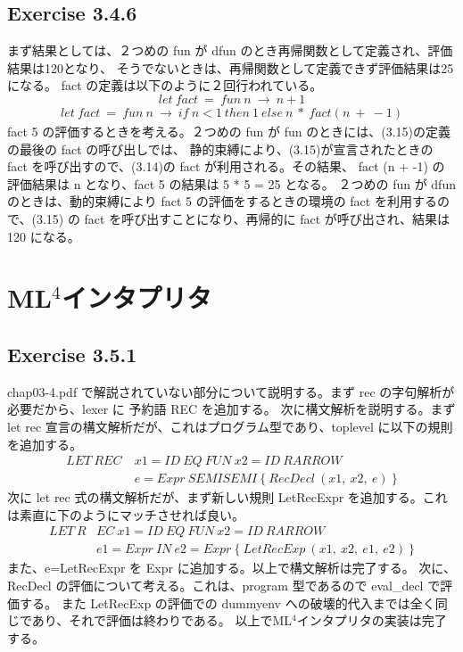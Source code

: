 \documentclass{jreport}
\begin{document}
		\section{Exercise 3.4.6}
			まず結果としては、２つめの fun が dfun のとき再帰関数として定義され、評価結果は120となり、
			そうでないときは、再帰関数として定義できず評価結果は25になる。
			fact の定義は以下のように２回行われている。
\begin{equation}let \ fact \ = \ fun \ n \ \rightarrow \ n+1\end{equation}
\begin{equation}
	\begin{split}
		let \ fact \ = \ fun \ n \ \rightarrow \ if \ n < 1 \ then \ 1 \ else \ n \ * \ fact(n \ + \ -1)
	\end{split}
\end{equation}
			fact 5 の評価するときを考える。２つめの fun が fun のときには、(3.15)の定義の最後の fact の呼び出しでは、
			静的束縛により、(3.15)が宣言されたときの fact を呼び出すので、(3.14)の fact が利用される。その結果、
			fact (n + -1) の評価結果は n となり、fact 5 の結果は 5 * 5 = 25 となる。
			２つめの fun が dfun のときは、動的束縛により fact 5 の評価をするときの環境の fact を利用するので、(3.15)
			の fact を呼び出すことになり、再帰的に fact が呼び出され、結果は 120 になる。
	\chapter{ML$^4$インタプリタ}
		\section{Exercise 3.5.1}
			chap03-4.pdf で解説されていない部分について説明する。まず rec の字句解析が必要だから、lexer に 予約語 REC を追加する。
			次に構文解析を説明する。まず let rec 宣言の構文解析だが、これはプログラム型であり、toplevel に以下の規則を追加する。
\begin{equation}
	\begin{split}
		LET \ REC \ &x1=ID \ EQ \ FUN \ x2=ID \ RARROW \ \\ &e=Expr \ SEMISEMI \ \{ \ RecDecl \ (x1, \ x2, \ e) \ \}
	\end{split}
\end{equation}
			次に let rec 式の構文解析だが、まず新しい規則 LetRecExpr を追加する。これは素直に下のようにマッチさせれば良い。
\begin{equation}
	\begin{split}
		LET \ R&EC \ x1=ID \ EQ \ FUN \ x2=ID \ RARROW \ \\ &e1=Expr \ IN \ e2=Expr \ \{ \ LetRecExp \ (x1, \ x2, \ e1, \ e2) \ \}
	\end{split}
\end{equation}
			また、e=LetRecExpr を Expr に追加する。以上で構文解析は完了する。
			次に、RecDecl の評価について考える。これは、program 型であるので eval\_decl で評価する。
			また LetRecExp の評価での dummyenv への破壊的代入までは全く同じであり、それで評価は終わりである。
			以上でML$^4$インタプリタの実装は完了する。
\end{document}
